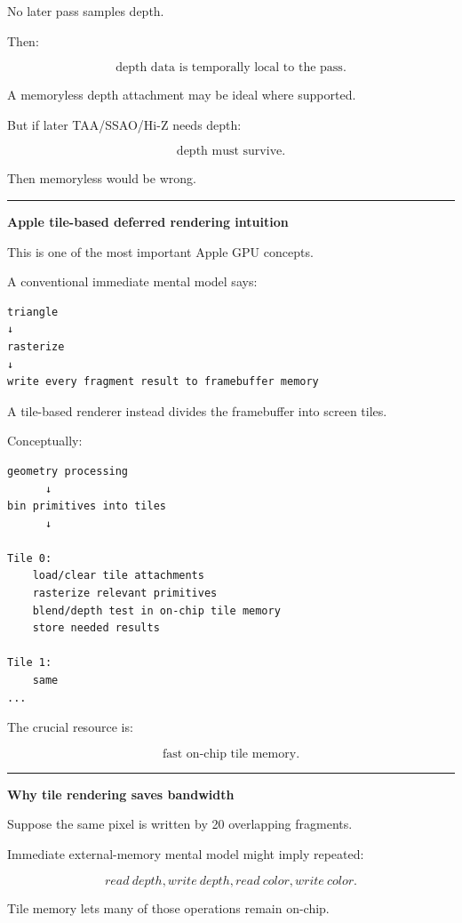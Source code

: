 No later pass samples depth.

Then:

\[
\boxed{
\text{depth data is temporally local to the pass}.
}
\]

A memoryless depth attachment may be ideal where supported.

But if later TAA/SSAO/Hi-Z needs depth:

\[
\boxed{
\text{depth must survive}.
}
\]

Then memoryless would be wrong.

\begin{center}\rule{0.5\linewidth}{0.5pt}\end{center}

\textbf{Apple tile-based deferred rendering intuition}

This is one of the most important Apple GPU concepts.

A conventional immediate mental model says:

\begin{verbatim}
triangle
↓
rasterize
↓
write every fragment result to framebuffer memory
\end{verbatim}

A tile-based renderer instead divides the framebuffer into screen tiles.

Conceptually:

\begin{verbatim}
geometry processing
      ↓
bin primitives into tiles
      ↓

Tile 0:
    load/clear tile attachments
    rasterize relevant primitives
    blend/depth test in on-chip tile memory
    store needed results

Tile 1:
    same
...
\end{verbatim}

The crucial resource is:

\[
\boxed{
\text{fast on-chip tile memory}.
}
\]

\begin{center}\rule{0.5\linewidth}{0.5pt}\end{center}

\textbf{Why tile rendering saves bandwidth}

Suppose the same pixel is written by 20 overlapping fragments.

Immediate external-memory mental model might imply repeated:

\[
read\ depth,
write\ depth,
read\ color,
write\ color.
\]

Tile memory lets many of those operations remain on-chip.

